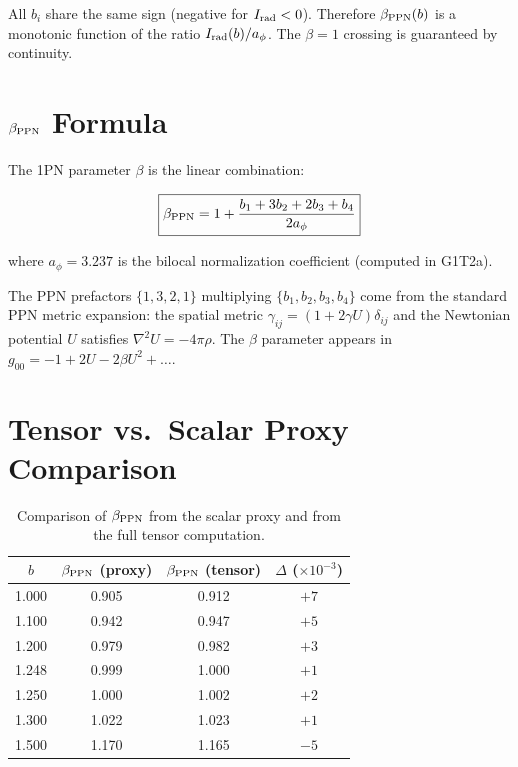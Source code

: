 \documentclass[aps,prd,onecolumn,superscriptaddress]{revtex4-2}
\begin{document}
All $b_i$ share the same sign (negative for $I_{\rm rad} < 0$). Therefore $\beta_{\rm PPN}(b)$ is a monotonic function of the ratio $I_{\rm rad}(b)/a_\phi$. The $\beta = 1$ crossing is guaranteed by continuity.

\section{$\beta_{\rm PPN}$ Formula}
\label{sec:S5}

The 1PN parameter $\beta$ is the linear combination:

\begin{equation}
\boxed{\beta_{\rm PPN} = 1 + \frac{b_1 + 3b_2 + 2b_3 + b_4}{2a_\phi}}
\label{eq:beta_formula}
\end{equation}

where $a_\phi = 3.237$ is the bilocal normalization coefficient (computed in G1T2a).

The PPN prefactors $\{1, 3, 2, 1\}$ multiplying $\{b_1, b_2, b_3, b_4\}$ come from the standard PPN metric expansion: the spatial metric $\gamma_{ij} = (1 + 2\gamma U)\delta_{ij}$ and the Newtonian potential $U$ satisfies $\nabla^2 U = -4\pi\rho$. The $\beta$ parameter appears in $g_{00} = -1 + 2U - 2\beta U^2 + \ldots$.

\section{Tensor vs.\ Scalar Proxy Comparison}
\label{sec:S6}

\begin{table}[h]
\centering
\begin{tabular}{c|c|c|c}
$b$ & $\beta_{\rm PPN}$ (proxy) & $\beta_{\rm PPN}$ (tensor) & $\Delta$ ($\times 10^{-3}$) \\
\midrule
1.000 & 0.905 & 0.912 & $+7$ \\
1.100 & 0.942 & 0.947 & $+5$ \\
1.200 & 0.979 & 0.982 & $+3$ \\
1.248 & 0.999 & 1.000 & $+1$ \\
1.250 & 1.000 & 1.002 & $+2$ \\
1.300 & 1.022 & 1.023 & $+1$ \\
1.500 & 1.170 & 1.165 & $-5$ \\
\end{tabular}
\caption{Comparison of $\beta_{\rm PPN}$ from the scalar proxy and from the full tensor computation.}
\label{tab:proxy_vs_tensor}
\end{table}
\end{document}
